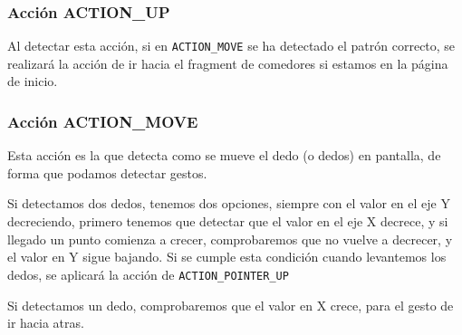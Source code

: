 \subsubsection{Acción ACTION\_UP}

Al detectar esta acción, si en \texttt{ACTION\_MOVE} se ha detectado el patrón correcto, se realizará la acción de ir hacia el fragment de comedores si estamos en la página de inicio.

\subsubsection{Acción ACTION\_MOVE}

Esta acción es la que detecta como se mueve el dedo (o dedos) en pantalla, de forma que podamos detectar gestos.

Si detectamos dos dedos, tenemos dos opciones, siempre con el valor en el eje Y decreciendo, primero tenemos que detectar que el valor en el eje X decrece, y si llegado un punto comienza a crecer, comprobaremos que no vuelve a decrecer, y el valor en Y sigue bajando. Si se cumple esta condición cuando levantemos los dedos, se aplicará la acción de \texttt{ACTION\_POINTER\_UP}

Si detectamos un dedo, comprobaremos que el valor en X crece, para el gesto de ir hacia atras.




